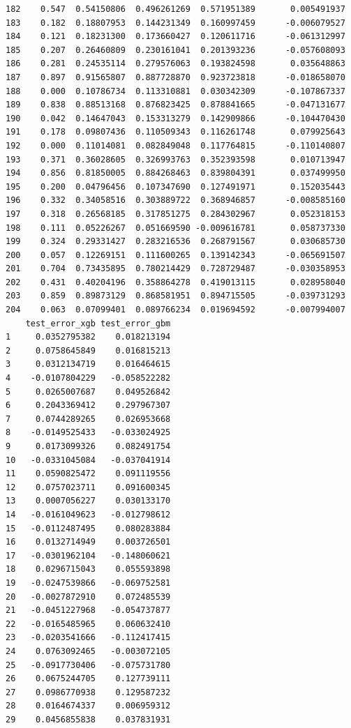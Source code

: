 \documentclass[
  letterpaper,
  DIV=11,
  numbers=noendperiod]{scrartcl}
\begin{document}
\begin{verbatim}
182    0.547  0.54150806  0.496261269  0.571951389       0.005491937
183    0.182  0.18807953  0.144231349  0.160997459      -0.006079527
184    0.121  0.18231300  0.173660427  0.120611716      -0.061312997
185    0.207  0.26460809  0.230161041  0.201393236      -0.057608093
186    0.281  0.24535114  0.279576063  0.193824598       0.035648863
187    0.897  0.91565807  0.887728870  0.923723818      -0.018658070
188    0.000  0.10786734  0.113310881  0.030342309      -0.107867337
189    0.838  0.88513168  0.876823425  0.878841665      -0.047131677
190    0.042  0.14647043  0.153313279  0.142909866      -0.104470430
191    0.178  0.09807436  0.110509343  0.116261748       0.079925643
192    0.000  0.11014081  0.082849048  0.117764815      -0.110140807
193    0.371  0.36028605  0.326993763  0.352393598       0.010713947
194    0.856  0.81850005  0.884268463  0.839804391       0.037499950
195    0.200  0.04796456  0.107347690  0.127491971       0.152035443
196    0.332  0.34058516  0.303889722  0.368946857      -0.008585160
197    0.318  0.26568185  0.317851275  0.284302967       0.052318153
198    0.111  0.05226267  0.051669590 -0.009616781       0.058737330
199    0.324  0.29331427  0.283216536  0.268791567       0.030685730
200    0.057  0.12269151  0.111600265  0.139142343      -0.065691507
201    0.704  0.73435895  0.780214429  0.728729487      -0.030358953
202    0.431  0.40204196  0.358864278  0.419013115       0.028958040
203    0.859  0.89873129  0.868581951  0.894715505      -0.039731293
204    0.063  0.07099401  0.089766234  0.019694592      -0.007994007
    test_error_xgb test_error_gbm
1     0.0352795382    0.018213194
2     0.0758645849    0.016815213
3     0.0312134719    0.016464615
4    -0.0107804229   -0.058522282
5     0.0265007687    0.049526842
6     0.2043369412    0.297967307
7     0.0744289265    0.026953668
8    -0.0149525433   -0.033024925
9     0.0173099326    0.082491754
10   -0.0331045084   -0.037041914
11    0.0590825472    0.091119556
12    0.0757023711    0.091600345
13    0.0007056227    0.030133170
14   -0.0161049623   -0.012798612
15   -0.0112487495    0.080283884
16    0.0132714949    0.003726501
17   -0.0301962104   -0.148060621
18    0.0296715043    0.055593898
19   -0.0247539866   -0.069752581
20   -0.0027872910    0.072485539
21   -0.0451227968   -0.054737877
22   -0.0165485965    0.060632410
23   -0.0203541666   -0.112417415
24    0.0763092465   -0.003072105
25   -0.0917730406   -0.075731780
26    0.0675244705    0.127739111
27    0.0986770938    0.129587232
28    0.0164674337    0.006959312
29    0.0456855838    0.037831931

\end{verbatim}
\end{document}
